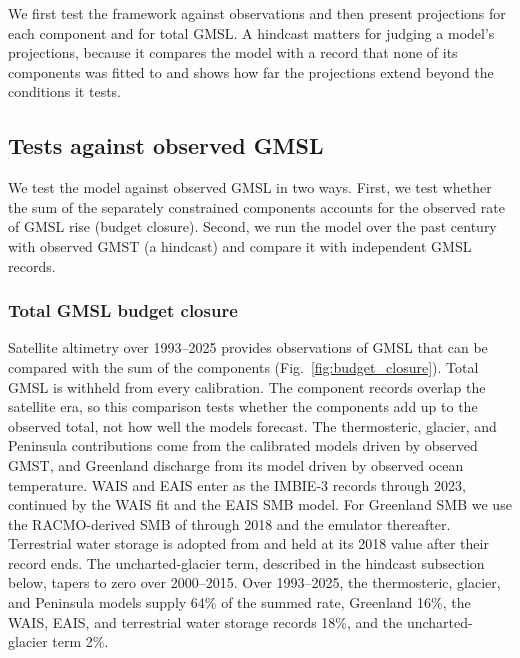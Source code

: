 \documentclass[draft,linenumbers]{agujournal2025}
\begin{document}
We first test the framework against observations and then present projections for each component and for total GMSL. A hindcast matters for judging a model's projections, because it compares the model with a record that none of its components was fitted to and shows how far the projections extend beyond the conditions it tests.

\subsection{Tests against observed GMSL}

We test the model against observed GMSL in two ways. First, we test whether the sum of the separately constrained components accounts for the observed rate of GMSL rise (budget closure). Second, we run the model over the past century with observed GMST (a hindcast) and compare it with independent GMSL records.

\subsubsection{Total GMSL budget closure}
\label{s:budget_close}

Satellite altimetry over 1993--2025 provides observations of GMSL \citep{Beckley2017,Hamlington2020} that can be compared with the sum of the components (Fig.~\ref{fig:budget_closure}). Total GMSL is withheld from every calibration. The component records overlap the satellite era, so this comparison tests whether the components add up to the observed total, not how well the models forecast. The thermosteric, glacier, and Peninsula contributions come from the calibrated models driven by observed GMST, and Greenland discharge from its model driven by observed ocean temperature. WAIS and EAIS enter as the IMBIE-3 records \citep{Otosaka2026} through 2023, continued by the WAIS fit and the EAIS SMB model. For Greenland SMB we use the RACMO-derived SMB of \citet{Mouginot2019} through 2018 and the emulator thereafter. Terrestrial water storage is adopted from \citet{Frederikse2020} and held at its 2018 value after their record ends. The uncharted-glacier term, described in the hindcast subsection below, tapers to zero over 2000--2015. Over 1993--2025, the thermosteric, glacier, and Peninsula models supply 64\% of the summed rate, Greenland 16\%, the WAIS, EAIS, and terrestrial water storage records 18\%, and the uncharted-glacier term 2\%.
\end{document}
